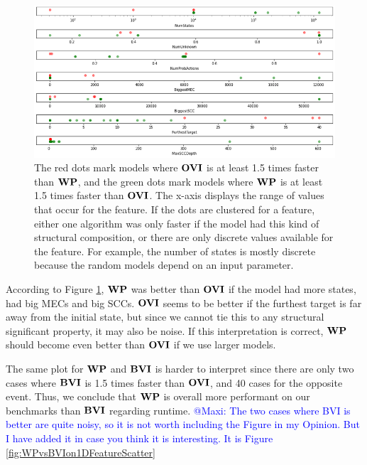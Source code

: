 \begin{figure}[t]
    \centering
    \includegraphics[width=1\textwidth]{figures/WPvsOVIon1DFeatureScatter.png}
    \caption[$\WP$ compared to $\OVI$]{
        The red dots mark models where $\OVI$ is at least 1.5 times faster than $\WP$, and the green dots mark models where $\WP$ is at least 1.5 times faster than $\OVI$.
        The x-axis displays the range of values that occur for the feature. 
        If the dots are clustered for a feature, either one algorithm was only faster if the model had this kind of structural composition, 
        or there are only discrete values available for the feature. For example, the number of states is mostly discrete because the random models depend on an input parameter.
    }
    \label{fig:WPvsOVIon1DFeatureScatter}
\end{figure}

According to Figure \ref{fig:WPvsOVIon1DFeatureScatter}, $\WP$ was better than $\OVI$ if the model had more states, had big MECs and big SCCs.
$\OVI$ seems to be better if the furthest target is far away from the initial state, but since we cannot tie this to any structural significant property,
it may also be noise. If this interpretation is correct, $\WP$ should become even better than $\OVI$ if we use larger models.

The same plot for $\WP$ and $\mathbf{BVI}$ is harder to interpret since there are only two cases where $\mathbf{BVI}$ is 1.5 times faster than $\OVI$, and 40 cases
for the opposite event. Thus, we conclude that $\WP$ is overall more performant on our benchmarks than $\mathbf{BVI}$ regarding runtime. 
\textcolor{blue}{@Maxi: The two cases where BVI is better are quite noisy, so it is not worth including the Figure in my Opinion.
But I have added it in case you think it is interesting. It is Figure \ref{fig:WPvsBVIon1DFeatureScatter}}


